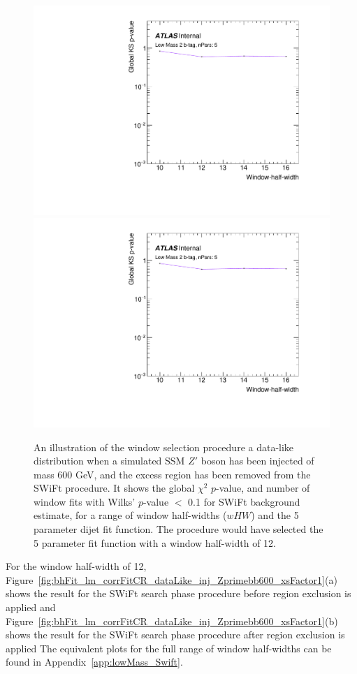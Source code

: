 \begin{figure}[!htb]
\captionsetup[subfigure]{aboveskip=0pt,justification=centering}
\centering
{} {
  \includegraphics[width=0.49\linewidth, angle=0,page=2]{figs/Dibjet/LowMass/FitStudy/windowSel_corrFitCR_dataLike_v11_Zprimebb600_xsFactor1_removeWindow.pdf}
}\hspace{-8mm}
 {
  \includegraphics[width=0.49\linewidth, angle=0,page=4]{figs/Dibjet/LowMass/FitStudy/windowSel_corrFitCR_dataLike_v11_Zprimebb600_xsFactor1_removeWindow.pdf}
}
\vspace{10pt}
\caption{\label{fig:windowSel_Zprimebb600_xsFactor1}
  An illustration of the window selection procedure a data-like distribution when
  a simulated SSM $Z'$ boson has been injected of mass 600 GeV, and the excess region has been removed from the SWiFt procedure.
  It shows the global $\chi^{2}$ \mbox{$p$-value}, %
  and number of window fits with Wilks' \mbox{$p$-value} $<$ 0.1 for SWiFt background estimate,
  for a range of window half-widths ($wHW$) and the 5 parameter dijet fit function.
  The procedure would have selected the 5 parameter fit function with a window half-width of 12.
}
\end{figure}

For the window half-width of 12, Figure~\ref{fig:bhFit_lm_corrFitCR_dataLike_inj_Zprimebb600_xsFactor1}(a)
shows the result for the SWiFt search phase procedure before region exclusion is applied 
and Figure~\ref{fig:bhFit_lm_corrFitCR_dataLike_inj_Zprimebb600_xsFactor1}(b)
shows the result for the SWiFt search phase procedure after region exclusion is applied
The equivalent plots for the full range of window half-widths can be found in Appendix~\ref{app:lowMass_Swift}.

